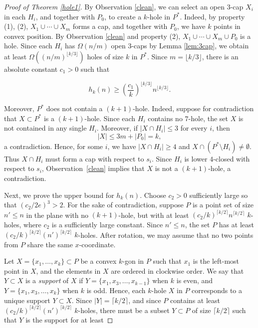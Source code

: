 \documentclass[10pt,a4paper]{amsart}
\begin{document}
\begin{proof}[Proof of Theorem \ref{hole1}]
By Observation \ref{clean}, we can select an open 3-cap $X_i$ in each $H_i$, and together with $P_0$, to create a $k$-hole in $P^{\ast}$.  Indeed, by property (1), (2), $X_1\cup \cdots \cup X_m$ forms a cap, and together with $P_0$, we have $k$ points in convex position.  By Observation \ref{clean} and property (2), $X_1\cup \cdots \cup X_m \cup P_0$ is a hole.  Since each $H_i$ has $\Omega(n/m)$ open 3-caps by Lemma \ref{lem:3cap}, we obtain at least $\Omega((n/m)^{\lfloor k/3\rfloor})$ holes of size $k$ in $P^{\ast}$.  Since $ m = \lfloor k/3\rfloor$, there is an absolute constant $c_1 > 0$ such that   

$$h_k(n) \geq \left(\frac{c_1}{k}\right)^{\lfloor k/3\rfloor }n^{\lfloor k/3\rfloor}.$$ 


Moreover, \(P^{\ast}\) does not contain a \((k+1)\)-hole.  Indeed, suppose
for contradiction that \(X\subset P^{\ast}\) is a \((k+1)\)-hole.  Since each
\(H_i\) contains no \(7\)-hole, the set \(X\) is not contained in any single
\(H_i\).  Moreover, if \(|X\cap H_i|\le 3\) for every \(i\), then
\[
        |X|\le 3m+|P_0|=k,
\]
a contradiction.  Hence, for some \(i\), we have \(|X\cap H_i|\ge 4\) and
\(X\cap(P^{\ast}\setminus H_i)\neq\emptyset\).  Thus \(X\cap H_i\) must form
a cap with respect to \(s_i\).  Since \(H_i\) is lower \(4\)-closed with
respect to \(s_i\), Observation~\ref{clean} implies that \(X\) is not a
\((k+1)\)-hole, a contradiction.


 
\medskip

Next, we prove the upper bound for \(h_k(n)\). Choose \(c_2>0\) sufficiently large so that \((c_2/2e)^3>2\).  For the sake of contradiction, suppose \(P\) is a point set of size \(n'\le n\) in the plane with no \((k+1)\)-hole, but with at least \(\left(c_2/k\right)^{\lceil k/2\rceil} n^{\lceil k/2\rceil}\) \(k\)-holes, where \(c_2\) is a sufficiently large constant. Since \(n'\le n\), the set \(P\) has at least \(\left(c_2/k\right)^{\lceil k/2\rceil}(n')^{\lceil k/2\rceil}\) \(k\)-holes. After rotation, we may assume that no two points from $P$ share the same $x$-coordinate. 

Let $X = \{x_1,\ldots, x_k\}\subset P$ be a convex $k$-gon in $P$ such that $x_1$ is the left-most point in $X$, and the elements in $X$ are ordered in clockwise order.  We say that $Y\subset X$ is a \emph{support} of $X$ if $Y  = \{x_1,x_3,\ldots, x_{k-1}\}$ when $k$ is even, and $Y = \{x_1,x_3,\ldots, x_k\}$ when $k$ is odd. Hence, each $k$-hole $X$ in $P$ corresponds to a unique support $Y\subset X$.  Since $|Y| = \lceil k/2\rceil$, and since \(P\) contains at least \(\left(c_2/k\right)^{\lceil k/2\rceil}(n')^{\lceil k/2\rceil}\) \(k\)-holes, there must be a subset $Y\subset P$ of size $\lceil k/2\rceil$ such that $Y$ is the support for at least


\end{proof}
\end{document}
